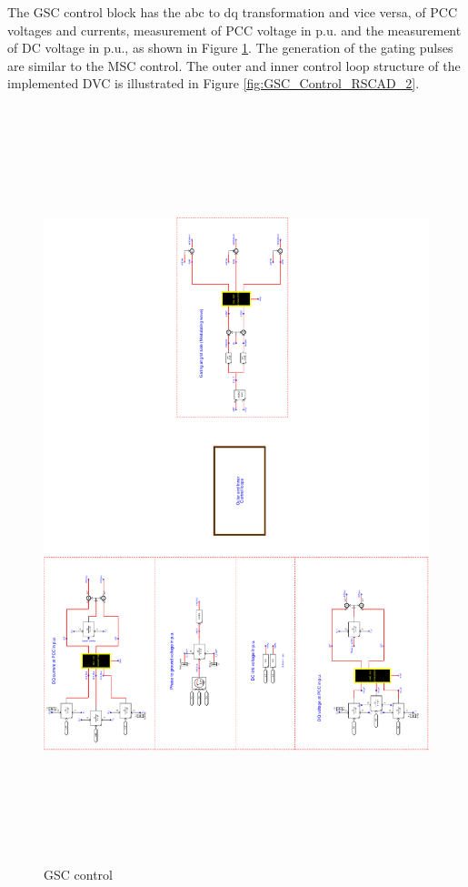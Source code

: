 The \gls{GSC} control block has the abc to dq transformation and vice versa, of \gls{PCC} voltages and currents, measurement of \gls{PCC} voltage in p.u. and the measurement of \gls{DC} voltage in p.u., as shown in Figure \ref{fig:GSC_Control_RSCAD_1}. The generation of the gating pulses are similar to the \gls{MSC} control. The outer and inner control loop structure of the implemented \gls{DVC} is illustrated in Figure \ref{fig:GSC_Control_RSCAD_2}.

\begin{figure}[H]
\centering
    \includegraphics[height = 22cm,width = 14.5cm]{Diagrams/Appendix_A/GSC_Control_RSCAD_1.pdf}
    \caption{GSC control}
    \label{fig:GSC_Control_RSCAD_1}
\end{figure}

